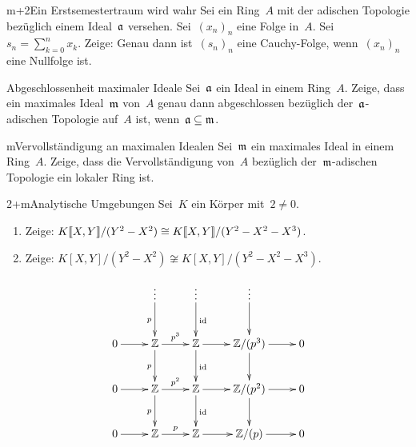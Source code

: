 \documentclass{uebblatt}
\begin{document}

\begin{aufgabe}{m+2}{Ein Erstsemestertraum wird wahr}
Sei ein Ring~$A$ mit der adischen Topologie bezüglich einem
Ideal~$\mathfrak{a}$ versehen.
Sei~$(x_n)_n$ eine Folge in~$A$. Sei~$s_n = \sum_{k=0}^n x_k$.
Zeige: Genau dann ist~$(s_n)_n$ eine Cauchy-Folge,
wenn~$(x_n)_n$ eine Nullfolge ist.
\end{aufgabe}


\begin{aufgabe}{3}{Abgeschlossenheit maximaler Ideale}
Sei~$\mathfrak{a}$ ein Ideal in einem Ring~$A$. Zeige, dass ein maximales Ideal~$\mathfrak{m}$
von~$A$ genau dann abgeschlossen bezüglich der~$\mathfrak{a}$-adischen Topologie
auf~$A$ ist, wenn~$\mathfrak{a} \subseteq \mathfrak{m}$.
\end{aufgabe}

\begin{aufgabe}{m}{Vervollständigung an maximalen Idealen}
Sei~$\mathfrak{m}$ ein maximales Ideal in einem Ring~$A$. Zeige, dass die
Vervollständigung von~$A$ bezüglich der~$\mathfrak{m}$-adischen Topologie ein lokaler
Ring ist.
\end{aufgabe}

\begin{aufgabe}{2+m}{Analytische Umgebungen}
Sei~$K$ ein Körper mit~$2 \neq 0$.
\begin{enumerate}
\item Zeige: ${K}\llbracket{X,Y}\rrbracket/(Y^2-X^2) \cong {K}\llbracket{X,Y}\rrbracket/(Y^2-X^2-X^3)$.
\item Zeige: $K[X,Y]/(Y^2-X^2) \not\cong K[X,Y]/(Y^2-X^2-X^3)$.
\end{enumerate}
\end{aufgabe}

\setlength{\wrapoverhang}{1.3cm}
\setlength{\columnsep}{0.8cm}
\begin{figure}
  \vspace{-6em}
  \scriptsize
  \[ \xymatrix{
    & \vdots \ar[d]_p & \vdots \ar[d]^\id & \vdots \ar[d] \\
    0 \ar[r] & \ZZ \ar[r]^{p^3}\ar[d]_p & \ZZ \ar[r]\ar[d]^\id & \ZZ/(p^3) \ar[r]\ar[d] & 0 \\
    0 \ar[r] & \ZZ \ar[r]^{p^2}\ar[d]_p & \ZZ \ar[r]\ar[d]^\id & \ZZ/(p^2) \ar[r]\ar[d] & 0 \\
    0 \ar[r] & \ZZ \ar[r]^p & \ZZ \ar[r] & \ZZ/(p) \ar[r] & 0
  } \]
\end{figure}
\end{document}

